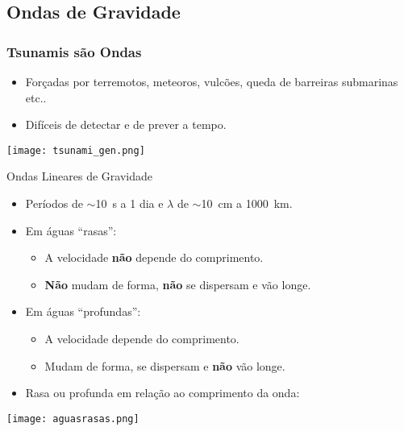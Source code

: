 \documentclass{beamer}
\begin{document}
\subsection{Ondas de Gravidade}
\begin{frame}
  \frametitle{Tsunamis são Ondas}
  \begin{itemize}\setlength{\itemsep}{2.5ex}
  \item Forçadas por terremotos, meteoros, vulcões, queda de barreiras submarinas etc..
  \item \alert{Difíceis de detectar e de prever a tempo.}
  \end{itemize}
  \centerline{\texttt{[image: tsunami\_gen.png]}}
\bigskip
\end{frame}
\begin{frame}{Ondas Lineares de Gravidade}
    \begin{itemize}
    \item Períodos de $\sim$10~s a 1 dia e $\lambda$ de $\sim$10~cm a 1000~km.
    \item \alert{Em águas ``rasas'':}
      \begin{itemize}
      \item A velocidade {\bf não} depende do comprimento.
      \item {\bf Não} mudam de forma, {\bf não} se dispersam e vão longe.  
      \end{itemize}
    \item \alert{Em águas ``profundas'':}
      \begin{itemize}
      \item A velocidade depende do comprimento.
      \item Mudam de forma, se dispersam e {\bf não} vão longe.  
      \end{itemize}
    \item \alert{Rasa ou profunda em relação ao comprimento da onda:}
    \end{itemize}
    \centerline{\texttt{[image: aguasrasas.png]}}  
\end{frame}
\end{document}
